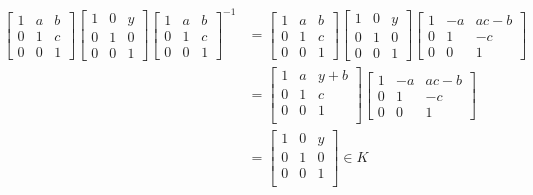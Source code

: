 \documentclass{article}
\begin{document}
\begin{equation}
    \begin{split}
        \begin{bmatrix}
            1 & a & b \\
            0 & 1 & c \\
            0 & 0 & 1 
        \end{bmatrix}
        \begin{bmatrix}
            1 & 0 & y \\
            0 & 1 & 0 \\
            0 & 0 & 1 
        \end{bmatrix}
        \begin{bmatrix}
            1 & a & b \\
            0 & 1 & c \\
            0 & 0 & 1 
        \end{bmatrix}^{-1}
        & = \begin{bmatrix}
            1 & a & b \\
            0 & 1 & c \\
            0 & 0 & 1 
        \end{bmatrix}
        \begin{bmatrix}
            1 & 0 & y \\
            0 & 1 & 0 \\
            0 & 0 & 1 
        \end{bmatrix}
        \begin{bmatrix}
            1 & -a & ac - b \\
            0 & 1 & -c \\
            0 & 0 & 1 
        \end{bmatrix} \\
        & = 
        \begin{bmatrix}
            1 & a & y + b \\
            0 & 1 & c \\
            0 & 0 & 1 \\
        \end{bmatrix}
        \begin{bmatrix}
            1 & -a & ac - b \\
            0 & 1 & -c \\
            0 & 0 & 1 
        \end{bmatrix} \\
        & = 
        \begin{bmatrix}
            1 & 0 & y \\
            0 & 1 & 0 \\
            0 & 0 & 1 \\
        \end{bmatrix}  \in K
    \end{split}
\end{equation}
\end{document}
